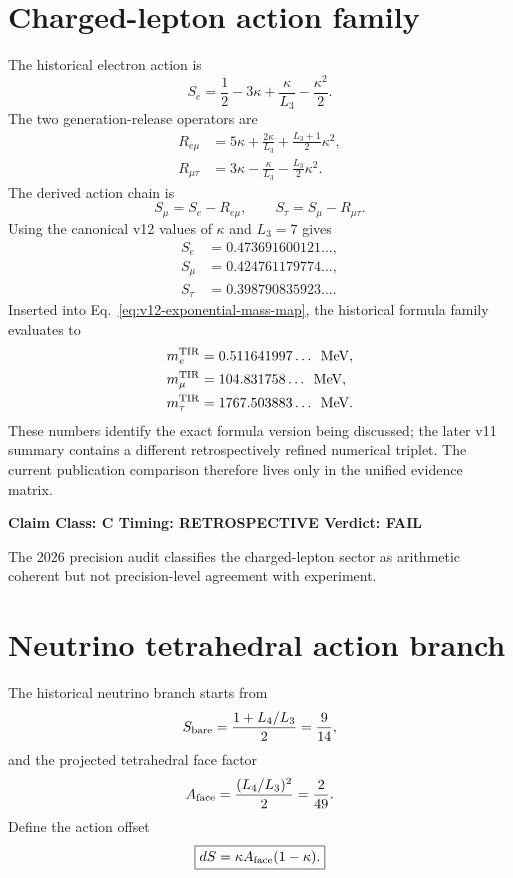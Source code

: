 \documentclass[11pt,a4paper,twoside]{book}
\theoremstyle{definition}
\newcommand{\vTwelveStatus}[3]{\par\noindent\textbf{Claim Class: #1 \quad Timing: #2 \quad Verdict: #3}\par}
\newcommand{\mev}{\,\text{MeV}}
\begin{document}
\section{Charged-lepton action family}
The historical electron action is
\begin{equation}
\boxed{
S_e
=\frac12-3\kappa+\frac{\kappa}{L_3}-\frac{\kappa^2}{2}.
}
\label{eq:v12-electron-action}
\end{equation}
The two generation-release operators are
\begin{align}
R_{e\mu}
&=5\kappa+\frac{2\kappa}{L_3}+\frac{L_3+1}{2}\kappa^2,
\label{eq:v12-electron-muon-release}\\
R_{\mu\tau}
&=3\kappa-\frac{\kappa}{L_3}-\frac{L_3}{2}\kappa^2.
\label{eq:v12-muon-tau-release}
\end{align}
The derived action chain is
\begin{equation}
\boxed{
S_\mu=S_e-R_{e\mu},
\qquad
S_\tau=S_\mu-R_{\mu\tau}.
}
\label{eq:v12-charged-lepton-actions}
\end{equation}
Using the canonical v12 values of $\kappa$ and $L_3=7$ gives
\begin{align}
S_e&=0.473691600121\ldots,\\
S_\mu&=0.424761179774\ldots,\\
S_\tau&=0.398790835923\ldots .
\end{align}
Inserted into Eq.~\eqref{eq:v12-exponential-mass-map}, the historical formula
family evaluates to
\begin{align}
m_e^{\rm TIR}&=0.511641997\ldots\ \mev,\\
m_\mu^{\rm TIR}&=104.831758\ldots\ \mev,\\
m_\tau^{\rm TIR}&=1767.503883\ldots\ \mev.
\end{align}
These numbers identify the exact formula version being discussed; the later
v11 summary contains a different retrospectively refined numerical triplet.
The current publication comparison therefore lives only in the unified evidence
matrix.

\vTwelveStatus{C}{RETROSPECTIVE}{FAIL}
The 2026 precision audit classifies the charged-lepton sector as arithmetic
coherent but not precision-level agreement with experiment.

\section{Neutrino tetrahedral action branch}
The historical neutrino branch starts from
\begin{equation}
S_{\rm bare}
=\frac{1+L_4/L_3}{2}
=\frac9{14},
\label{eq:v12-neutrino-bare-action}
\end{equation}
and the projected tetrahedral face factor
\begin{equation}
A_{\rm face}
=\frac{(L_4/L_3)^2}{2}
=\frac2{49}.
\label{eq:v12-neutrino-face-area}
\end{equation}
Define the action offset
\begin{equation}
\boxed{
dS
=\kappa A_{\rm face}(1-\kappa).
}
\label{eq:v12-neutrino-offset}
\end{equation}
\end{document}
